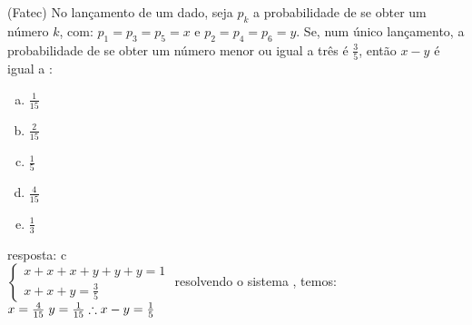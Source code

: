 \begin{ex}
(Fatec) No lançamento de um dado, seja $p_k$ a probabilidade de se obter um número $k$, com:  $ p_1=p_3=p_5=x $  e $ p_2=p_4=p_6=y $. Se, num único lançamento, a probabilidade de se obter um número menor ou igual a três é $\frac{3}{5}$, então $ x-y $ é igual a :
   \begin{enumerate}[(a)]
   \item $\frac{1}{15}$
   \item $\frac{2}{15}$
   \item $\frac{1}{5}$
   \item $\frac{4}{15}$
   \item $\frac{1}{3}$
   \end{enumerate}
    \begin{sol}
     resposta: c \\
     $
     \left\{
     \begin{array}{cl}
     x+x+x+y+y+y=1\\
     x+x+y=\frac{3}{5}
     \end{array}
     \right.
     $
     resolvendo o sistema , temos: $x=\frac{4}{15}\hspace{0,1cm}y=\frac{1}{15} \therefore x-y=\frac{1}{5}$
    \end{sol}
\end{ex}
